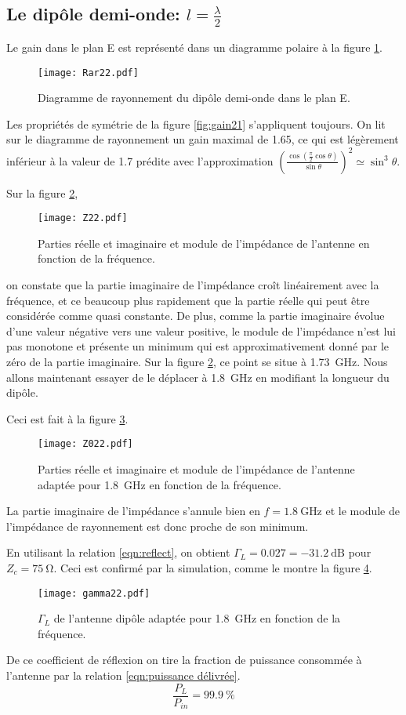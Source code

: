 \subsection{Le dipôle demi-onde: $l = \frac{\lambda}{2}$}
\label{subsec:demionde}
Le gain dans le plan E est représenté dans un diagramme polaire à la figure \ref{fig:gain22}.
\begin{figure}[htbp]
  \centering
  \texttt{[image: Rar22.pdf]}
  \caption{Diagramme de rayonnement du dipôle demi-onde dans le plan E.\label{fig:gain22}}
\end{figure}
Les propriétés de symétrie de la figure \ref{fig:gain21} s'appliquent toujours. On lit sur le diagramme de rayonnement un gain maximal de \num{1.65}, ce qui est légèrement inférieur à la valeur de \num{1.7} prédite avec l'approximation $\left ( \frac{\cos(\frac{\pi}{2}\cos\theta)}{\sin\theta} \right ) ^2 \simeq \sin^3 \theta$.

Sur la figure \ref{fig:Z22},
\begin{figure}[htbp]
  \centering
  \texttt{[image: Z22.pdf]}
  \caption{Parties réelle et imaginaire et module de l'impédance de l'antenne en fonction de la fréquence.\label{fig:Z22}}
\end{figure}
on constate que la partie imaginaire de l'impédance croît linéairement avec la fréquence, et ce beaucoup plus rapidement que la partie réelle qui peut être considérée comme quasi constante. De plus, comme la partie imaginaire évolue d'une valeur négative vers une valeur positive, le module de l'impédance n'est lui pas monotone et présente un minimum qui est approximativement donné par le zéro de la partie imaginaire. Sur la figure \ref{fig:Z22}, ce point se situe à \SI{1.73}{\giga\hertz}. Nous allons maintenant essayer de le déplacer à \SI{1.8}{\giga\hertz} en modifiant la longueur du dipôle.

Ceci est fait à la figure \ref{fig:Z022}.
\begin{figure}[htbp]
  \centering
  \texttt{[image: Z022.pdf]}
  \caption{Parties réelle et imaginaire et module de l'impédance de l'antenne adaptée pour \SI{1.8}{\giga\hertz} en fonction de la fréquence.\label{fig:Z022}}
\end{figure}
La partie imaginaire de l'impédance s'annule bien en $f = \SI{1.8}{\giga\hertz}$ et le module de l'impédance de rayonnement est donc proche de son minimum.

En utilisant la relation \ref{eqn:reflect}, on obtient $\Gamma_L = 0.027 = \SI{-31.2}{\deci\bel}$ pour $Z_c = \SI{75}{\ohm}$. Ceci est confirmé par la simulation, comme le montre la figure \ref{fig:gamma22}.
\begin{figure}[htbp]
  \centering
  \texttt{[image: gamma22.pdf]}
  \caption{$\Gamma_L$ de l'antenne dipôle adaptée pour \SI{1.8}{\giga\hertz} en fonction de la fréquence.\label{fig:gamma22}}
\end{figure}
De ce coefficient de réflexion on tire la fraction de puissance consommée à l'antenne par la relation \ref{eqn:puissance délivrée}.
\[
  \frac{P_L}{P_{in}} = \SI{99.9}{\percent}
\]

